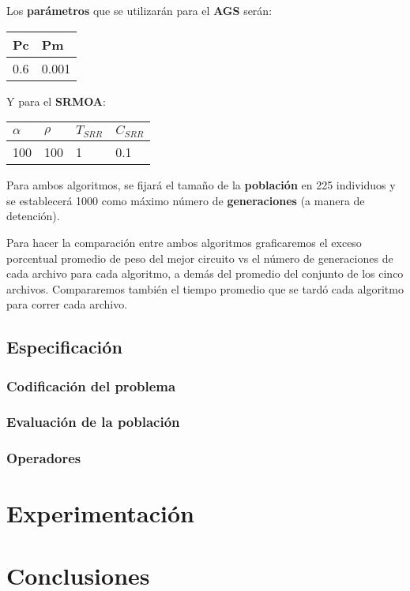 \documentclass[12pt]{article}
\begin{document}
Los \textbf{parámetros} que se utilizarán para el \textbf{AGS} serán:
\begin{center}
\begin{tabularx}{0.25\textwidth}{|X|X|}
  \hline
\textbf{Pc} &  \textbf{Pm} \\ \hline
0.6 & 0.001 \\ \hline
\end{tabularx}
\end{center}

Y para el \textbf{SRMOA}:
\begin{center}
\begin{tabularx}{0.30\textwidth}{|X|X|X|X|}
  \hline
\textbf{$\alpha$} &  \textbf{$\rho$} & \textbf{$T_{SRR}$} & \textbf{$C_{SRR}$}\\ \hline
100 & 100 & 1 & 0.1 \\ \hline
\end{tabularx}
\end{center}

Para ambos algoritmos, se fijará el tamaño de la \textbf{población} en 225 individuos y se establecerá 1000 como máximo número de \textbf{generaciones} (a manera de detención).

Para hacer la comparación entre ambos algoritmos graficaremos el exceso porcentual promedio de peso del mejor circuito vs el número de generaciones de cada archivo para cada algoritmo, a demás del promedio del conjunto de los cinco archivos. Compararemos también el tiempo promedio que se tardó cada algoritmo para correr cada archivo.

\subsection*{Especificación}
\subsubsection*{Codificación del problema}

\subsubsection*{Evaluación de la población}

\subsubsection*{Operadores}

\section*{Experimentación}

\section*{Conclusiones}
\end{document}
